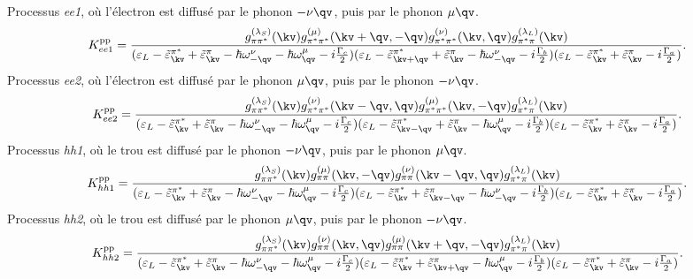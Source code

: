 \noindent
Processus \textit{ee1}, où l'électron est diffusé par le phonon $-\nu\qv$, puis par le phonon $\mu\qv$.
\begin{equation}
        K_{ee1}^{\text{pp}} = \frac{g^{(\lambda_S)}_{\pi\pi^*}(\kv)g^{(\mu)}_{\pi^*\pi^*}(\kv+\qv,-\qv)g_{\pi^*\pi^*}^{(\nu)}(\kv,\qv)g_{\pi^*\pi}^{(\lambda_L)}(\kv)}{(\varepsilon_L-\tilde{\varepsilon}_\kv^{\pi^*}+\tilde{\varepsilon}_\kv^\pi-\hbar\omega_{-\qv}^\nu-\hbar\omega_\qv^\mu-i\frac{\Gamma_c}{2})(\varepsilon_L-\tilde{\varepsilon}_{\kv+\qv}^{\pi^*}+\tilde{\varepsilon}_\kv^\pi-\hbar\omega_{-\qv}^\nu-i\frac{\Gamma_b}{2})(\varepsilon_L-\tilde{\varepsilon}_\kv^{\pi^*}+\tilde{\varepsilon}_{\kv}^\pi-i\frac{\Gamma_a}{2})}\label{eqn:pp_ee1}.
\end{equation}
Processus \textit{ee2}, où l'électron est diffusé par le phonon $\mu\qv$, puis par le phonon $-\nu\qv$.
\begin{equation}
        K_{ee2}^{\text{pp}} = \frac{g^{(\lambda_S)}_{\pi\pi^*}(\kv)g^{(\nu)}_{\pi^*\pi^*}(\kv-\qv,\qv)g_{\pi^*\pi^*}^{(\mu)}(\kv,-\qv)g_{\pi^*\pi}^{(\lambda_L)}(\kv)}{(\varepsilon_L-\tilde{\varepsilon}_\kv^{\pi^*}+\tilde{\varepsilon}_\kv^\pi-\hbar\omega_{-\qv}^\nu-\hbar\omega_\qv^\mu-i\frac{\Gamma_c}{2})(\varepsilon_L-\tilde{\varepsilon}_{\kv-\qv}^{\pi^*}+\tilde{\varepsilon}_\kv^\pi-\hbar\omega_{\qv}^\mu-i\frac{\Gamma_b}{2})(\varepsilon_L-\tilde{\varepsilon}_\kv^{\pi^*}+\tilde{\varepsilon}_{\kv}^\pi-i\frac{\Gamma_a}{2})}\label{eqn:pp_ee2}.
\end{equation}
Processus \textit{hh1}, où le trou est diffusé par le phonon $-\nu\qv$, puis par le phonon $\mu\qv$.
\begin{equation}
        K_{hh1}^{\text{pp}} = \frac{g^{(\lambda_S)}_{\pi\pi^*}(\kv)g^{(\mu)}_{\pi\pi}(\kv,-\qv)g_{\pi\pi}^{(\nu)}(\kv-\qv,\qv)g_{\pi^*\pi}^{(\lambda_L)}(\kv)}{(\varepsilon_L-\tilde{\varepsilon}_\kv^{\pi^*}+\tilde{\varepsilon}_\kv^\pi-\hbar\omega_{-\qv}^\nu-\hbar\omega_\qv^\mu-i\frac{\Gamma_c}{2})(\varepsilon_L-\tilde{\varepsilon}_{\kv}^{\pi^*}+\tilde{\varepsilon}_{\kv-\qv}^\pi-\hbar\omega_{-\qv}^\nu-i\frac{\Gamma_b}{2})(\varepsilon_L-\tilde{\varepsilon}_\kv^{\pi^*}+\tilde{\varepsilon}_{\kv}^\pi-i\frac{\Gamma_a}{2})}\label{eqn:pp_hh1}.
\end{equation}
Processus \textit{hh2}, où le trou est diffusé par le phonon $\mu\qv$, puis par le phonon $-\nu\qv$.
\begin{equation}
        K_{hh2}^{\text{pp}} = \frac{g^{(\lambda_S)}_{\pi\pi^*}(\kv)g^{(\nu)}_{\pi\pi}(\kv,\qv)g_{\pi\pi}^{(\mu)}(\kv+\qv,-\qv)g_{\pi^*\pi}^{(\lambda_L)}(\kv)}{(\varepsilon_L-\tilde{\varepsilon}_\kv^{\pi^*}+\tilde{\varepsilon}_\kv^\pi-\hbar\omega_{-\qv}^\nu-\hbar\omega_\qv^\mu-i\frac{\Gamma_c}{2})(\varepsilon_L-\tilde{\varepsilon}_{\kv}^{\pi^*}+\tilde{\varepsilon}_{\kv+\qv}^\pi-\hbar\omega_{\qv}^\mu-i\frac{\Gamma_b}{2})(\varepsilon_L-\tilde{\varepsilon}_\kv^{\pi^*}+\tilde{\varepsilon}_{\kv}^\pi-i\frac{\Gamma_a}{2})}\label{eqn:pp_hh2}.
\end{equation}
